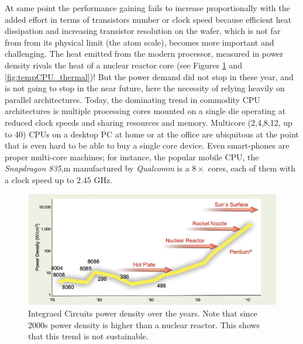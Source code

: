 At same point the performance gaining fails to increase proportionally with the added effort in terms of transistors number or clock speed because efficient heat dissipation and increasing transistor resolution on the wafer, which is not far from from its physical limit (the atom scale),  becomes more important and challenging.
The heat emitted from the modern processor, measured in power density rivals the heat of a nuclear reactor core (see Figures \ref{fig:tempCPU} and \ref{fig:tempCPU_thermal})!
But the power demand did not stop in these year, and is not going to stop in the near future, here the necessity of relying heavily on parallel architectures. Today, the dominating trend in commodity CPU architectures is multiple processing cores mounted on a single die operating at reduced clock speeds and sharing resources and memory. Multicore (2,4,8,12, up to 40) CPUs on a desktop PC at home or at the office are ubiquitous at the point that is even hard to be able to buy a single core device.
Even smart-phones are proper multi-core machines; for instance, the popular mobile CPU, the \textit{Snapdragon 835},m manufactured by \textit{Qualcomm} is a $8 \times$ cores, each of them with a clock speed up to $2.45$ \si{GHz}.
\begin{figure}[!htbp]
\centering
\includegraphics[width=1.0\textwidth]{./images/parallel_programming/temperatureCPU}
\caption[Temperature density of CPUs over the years.]{Integraed Circuits power density over the years. Note  that since 2000s power density is higher than a nuclear reactor. This shows that this trend is not sustainable.}\label{fig:tempCPU}
\end{figure}

